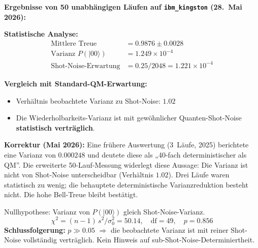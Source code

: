 \textbf{Ergebnisse von 50 unabhängigen Läufen auf \texttt{ibm\_kingston} (28.~Mai 2026):}

\begin{table}[h]
	\centering
	\caption{Bell-Zustands-Treue: Experimentelle Ergebnisse (50 Läufe)}
	\label{tab:bell_fidelity}
\end{table}

\textbf{Statistische Analyse:}
\begin{align}
	\text{Mittlere Treue} &= 0.9876 \pm 0.0028 \\
	\text{Varianz } P(|00\rangle) &= 1.249 \times 10^{-4} \\
	\text{Shot-Noise-Erwartung} &= 0.25/2048 = 1.221 \times 10^{-4}
\end{align}

\textbf{Vergleich mit Standard-QM-Erwartung:}
\begin{itemize}
	\item Verhältnis beobachtete Varianz zu Shot-Noise: $1.02$
	\item Die Wiederholbarkeits-Varianz ist mit gewöhnlicher Quanten-Shot-Noise \textbf{statistisch verträglich}.
\end{itemize}

\begin{important}
	\textbf{Korrektur (Mai 2026):} Eine frühere Auswertung (3~Läufe, 2025) berichtete eine Varianz von $0.000248$ und deutete diese als „40-fach deterministischer als QM''. Die erweiterte 50-Lauf-Messung widerlegt diese Aussage: Die Varianz ist nicht von Shot-Noise unterscheidbar (Verhältnis $1.02$). Drei Läufe waren statistisch zu wenig; die behauptete deterministische Varianzreduktion besteht nicht. Die hohe Bell-Treue bleibt bestätigt.
\end{important}

\begin{keyresult}
	Nullhypothese: Varianz von $P(|00\rangle)$ gleich Shot-Noise-Varianz.
	\begin{equation}
		\chi^2 = (n-1)\,s^2/\sigma_0^2 = 50.14, \quad \mathrm{df}=49, \quad p = 0.856
	\end{equation}
	\textbf{Schlussfolgerung:} $p \gg 0.05$ $\Rightarrow$ die beobachtete Varianz ist mit reiner Shot-Noise vollständig verträglich. Kein Hinweis auf sub-Shot-Noise-Determiniertheit.
\end{keyresult}

